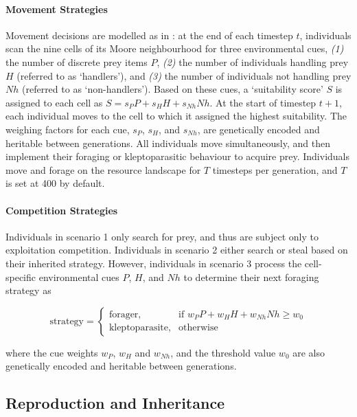 \documentclass[11pt]{article}
\begin{document}
\paragraph{Movement Strategies}

Movement decisions are modelled as in \citep{netz2020}: at the end of each timestep $t$, individuals scan the nine cells of its Moore neighbourhood for three environmental cues, \textit{(1)} the number of discrete prey items $P$, \textit{(2)} the number of individuals handling  prey $H$ (referred to as `handlers'), and \textit{(3)} the number of individuals not handling prey $Nh$ (referred to as `non-handlers').
Based on these cues, a `suitability score' $S$ is assigned to each cell as $S = s_PP + s_HH + s_{Nh}Nh$.
At the start of timestep $t+1$, each individual moves to the cell to which it assigned the highest suitability.
The weighing factors for each cue, $s_P$, $s_H$, and $s_{Nh}$, are genetically encoded and heritable between generations.
All individuals move simultaneously, and then implement their foraging or kleptoparasitic behaviour to acquire prey.
Individuals move and forage on the resource landscape for $T$ timesteps per generation, and $T$ is set at 400 by default.

\paragraph{Competition Strategies}

Individuals in scenario 1 only search for prey, and thus are subject only to exploitation competition. 
Individuals in scenario 2 either search or steal based on their inherited strategy.
However, individuals in scenario 3 process the cell-specific environmental cues $P$, $H$, and $Nh$ to determine their next foraging strategy as
\begin{linenomath*}
    \begin{equation}
        \text{strategy} = 
    \begin{cases}
        \text{forager},& \text{if } w_PP + w_HH + w_{Nh}Nh \geq w_0\\
        \text{kleptoparasite},              & \text{otherwise}
    \end{cases}
    \end{equation}  
\end{linenomath*}
where the cue weights $w_P$, $w_H$ and $w_{Nh}$, and the threshold value $w_0$ are also genetically encoded and heritable between generations.

\subsection{Reproduction and Inheritance}
\end{document}
